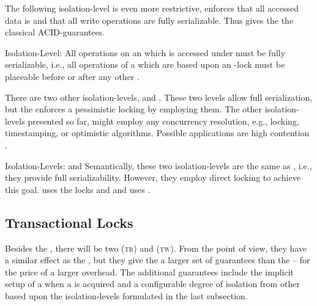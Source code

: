 \documentclass[a4paper, 12pt]{book}
\begin{document}
The following isolation-level is even more restrictive, \isoACCURATE enforces
that all accessed data is  and that all write operations are
fully serializable. Thus \isoACCURATE gives the  the classical
ACID-guarantees.
%
\begin{definition*}{Isolation-Level: \isoACCURATE}
  All operations on an  which is accessed under \isoACCURATE must
  be fully serializable, i.e., all operations of a 
  which are based upon an \isoACCURATE-lock must be placeable
  before or after any other .
\end{definition*}

There are two other isolation-levels, \isoPESSIMISTIC and
\isoEXCLUSIVE. These two levels allow full serialization, but the
 enforces a pessimistic locking by employing them. The
other isolation-levels presented so far, might employ any concurrency
resolution, e.g., locking, timestamping, or optimistic
algorithms. Possible applications are high contention .
%
\begin{definition*}{Isolation-Levels: \isoPESSIMISTIC and \isoEXCLUSIVE}
  Semantically, these two isolation-levels are the same as
  \isoACCURATE, i.e., they provide full serializability.
  However, they employ direct locking to achieve this goal. \isoPESSIMISTIC
  uses the locks \PROTREAD and \PROTWRITE and \isoEXCLUSIVE uses \EXCLUSIVE.
\end{definition*}


\subsection{Transactional Locks}
\label{sec:esa:def:transactional-locks}

\newcommand{\TRANSREAD}{{\normalfont\textsc{tr}}\xspace}
\newcommand{\TRANSWRITE}{{\normalfont\textsc{tw}}\xspace}


Besides the , there will be two 
 (\TRANSREAD) and  (\TRANSWRITE).
%
From the  point of view, they have a similar effect as the
, but they give the  a larger set of guarantees
than the  -- for the price of a larger overhead. The additional
guarantees include the implicit setup of a  when a
 is acquired and a configurable degree of isolation
from other  based upon the isolation-levels formulated
in the last subsection.
\end{document}
